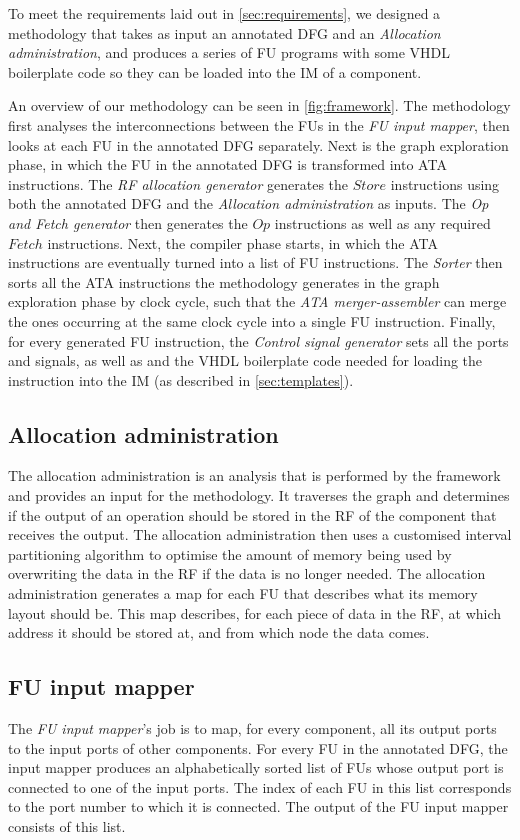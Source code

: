 To meet the requirements laid out in \ref{sec:requirements}, we designed a methodology that takes as input an annotated DFG and an \textit{Allocation administration}, and produces a series of FU programs with some VHDL boilerplate code so they can be loaded into the IM of a component.

An overview of our methodology can be seen in \ref{fig:framework}. The methodology first analyses the interconnections between the FUs in the \textit{FU input mapper}, then looks at each FU in the annotated DFG separately. Next is the graph exploration phase, in which the FU in the annotated DFG is transformed into ATA instructions.
The \textit{RF allocation generator} generates the $Store$ instructions using both the annotated DFG and the \textit{Allocation administration} as inputs.
The \textit{Op and Fetch generator} then generates the $Op$ instructions as well as any required $Fetch$ instructions.
Next, the compiler phase starts, in which the ATA instructions are eventually turned into a list of FU instructions.
The \textit{Sorter} then sorts all the ATA instructions the methodology generates in the graph exploration phase by clock cycle, such that the \textit{ATA merger-assembler} can merge the ones occurring at the same clock cycle into a single FU instruction. Finally, for every generated FU instruction, the \textit{Control signal generator} sets all the ports and signals, as well as and the VHDL boilerplate code needed for loading the instruction into the IM (as described in \ref{sec:templates}).

\subsection*{Allocation administration}
The allocation administration is an analysis that is performed by the \frameworkname framework and provides an input for the methodology. It traverses the graph and determines if the output of an operation should be stored in the RF of the component that receives the output. The allocation administration then uses a customised interval partitioning algorithm to optimise the amount of memory being used by overwriting the data in the RF if the data is no longer needed. The allocation administration generates a map for each FU that describes what its memory layout should be. This map describes, for each piece of data in the RF, at which address it should be stored at, and from which node the data comes.

\subsection*{FU input mapper}
The \textit{FU input mapper}'s job is to map, for every component, all its output ports to the input ports of other components. For every FU in the annotated DFG, the input mapper produces an alphabetically sorted list of FUs whose output port is connected to one of the input ports. The index of each FU in this list corresponds to the port number to which it is connected. The output of the FU input mapper consists of this list.

